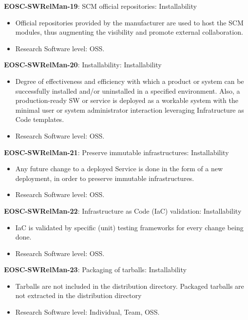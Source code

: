 \textbf{EOSC-SWRelMan-19}: SCM official repositories: Installability

\begin{itemize}
    \item Official repositories provided by the manufacturer are used to host the SCM modules, thus augmenting the visibility and promote external collaboration. \cite{orviz_set_2017}
    \item Research Software level: OSS.
\end{itemize}

\textbf{EOSC-SWRelMan-20}: Installability: Installability

\begin{itemize}
    \item Degree of effectiveness and efficiency with which a product or system can be successfully installed and/or uninstalled in a specified environment. Also, a production-ready SW or service is deployed as a workable system with the minimal user or system administrator interaction leveraging Infratructure as Code templates. \cite{iso_25010_2011_2017,orviz_fernandez_eosc-synergy_2020}
    \item Research Software level: OSS.
\end{itemize}

\textbf{EOSC-SWRelMan-21}: Preserve immutable infrastructures: Installability

\begin{itemize}
    \item Any future change to a deployed Service is done in the form of a new deployment, in order to preserve immutable infrastructures. \cite{orviz_fernandez_eosc-synergy_2020}
    \item Research Software level: OSS.
\end{itemize}

\textbf{EOSC-SWRelMan-22}: Infrastructure as Code (IaC) validation: Installability

\begin{itemize}
    \item IaC is validated by specific (unit) testing frameworks for every change being done. \cite{orviz_fernandez_eosc-synergy_2020}
    \item Research Software level: OSS.
\end{itemize}

\textbf{EOSC-SWRelMan-23}: Packaging of tarballs: Installability

\begin{itemize}
    \item Tarballs are not included in the distribution directory. Packaged tarballs are not extracted in the distribution directory \cite{raymond_software_2013}
    \item Research Software level: Individual, Team, OSS.
\end{itemize}

